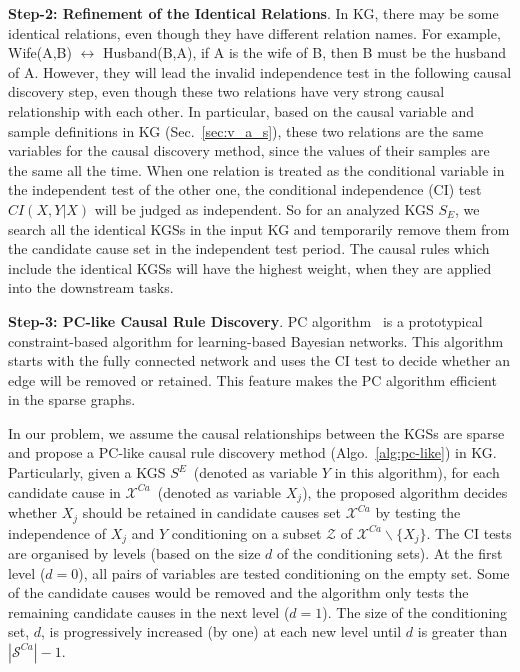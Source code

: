 \noindent
\textbf{Step-2: Refinement of the Identical Relations}.
In KG, there may be some identical relations, even though they have different relation names.
For example, Wife(A,B) $\leftrightarrow$ Husband(B,A), if A is the wife of B, then B must be the husband of A.
However, they will lead the invalid independence test in the following causal discovery step, even though these two relations have very strong causal relationship with each other.
In particular, based on the causal variable and sample definitions in KG (Sec.~\ref{sec:v_a_s}), these two relations are the same variables for the causal discovery method, since the values of their samples are the same all the time.
When one relation is treated as the conditional variable in the independent test of the other one, the conditional independence (CI) test $CI(X,Y|X)$ will be judged as independent.
So for an analyzed KGS $S_E$, we search all the identical KGSs in the input KG and temporarily remove them from the candidate cause set in the independent test period.
The causal rules which include the identical KGSs will have the highest weight, when they are applied into the downstream tasks.

\noindent
\textbf{Step-3: PC-like Causal Rule Discovery}.
PC algorithm~\cite{tsagris2019bayesian} is a prototypical constraint-based algorithm for learning-based Bayesian networks.
This algorithm starts with the fully connected network and uses the CI test to decide whether an edge will be removed or retained.
This feature makes the PC algorithm efficient in the sparse graphs.


In our problem, we assume the causal relationships between the KGSs are sparse and propose a PC-like causal rule discovery method (Algo.~\ref{alg:pc-like}) in KG.
Particularly, given a KGS $S^{E}$~(denoted as variable $Y$ in this algorithm), for each candidate cause in $\mathcal{X}^{Ca}$~(denoted as variable $X_j$),
the proposed algorithm decides whether $X_j$ should be retained in candidate causes set $\mathcal{X}^{Ca}$ by testing the independence of $X_j$ and $Y$ conditioning on a subset $\mathcal{Z}$ of $\mathcal{X}^{Ca}\backslash \{X_j\}$.
The CI tests are organised by levels (based on the size $d$ of the conditioning sets).
At the first level ($d = 0$), all pairs of variables are tested conditioning on the empty set.
Some of the candidate causes would be removed and the algorithm only tests the remaining candidate causes in the next level ($d = 1$).
The size of the conditioning set, $d$, is progressively increased (by one) at each new level until $d$ is greater than $|\mathcal{S}^{Ca}|-1$.




